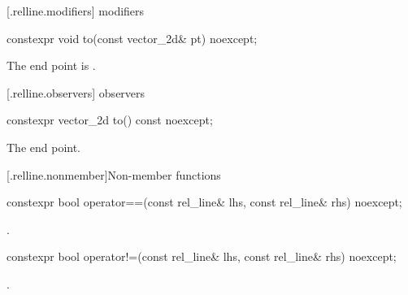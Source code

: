  [\iotwod.relline.modifiers]{ modifiers}%

\begin{itemdecl}
constexpr void to(const vector_2d& pt) noexcept;
\end{itemdecl}
\begin{itemdescr}
\pnum
\effects
The end point is .
\end{itemdescr}

 [\iotwod.relline.observers]{ observers}%

%
\begin{itemdecl}
constexpr vector_2d to() const noexcept;
\end{itemdecl}
\begin{itemdescr}
\pnum
\returns
The end point.
\end{itemdescr}

 [\iotwod.relline.nonmember]{Non-member functions}%

%
\begin{itemdecl}
constexpr bool operator==(const rel_line& lhs, const rel_line& rhs) noexcept;
\end{itemdecl}
\begin{itemdescr}
\pnum
\returns
{}.
\end{itemdescr}

%
\begin{itemdecl}
constexpr bool operator!=(const rel_line& lhs, const rel_line& rhs) noexcept;
\end{itemdecl}
\begin{itemdescr}
\pnum
\returns
{}.
\end{itemdescr}
